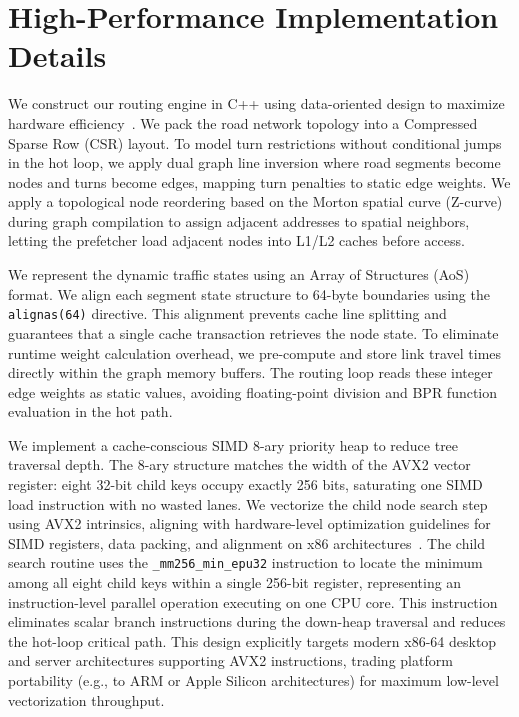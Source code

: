 \section{High-Performance Implementation Details}
\label{sec:implementation}

We construct our routing engine in C++ using data-oriented design to maximize hardware efficiency~\cite{drepper2007memory}. We pack the road network topology into a Compressed Sparse Row (CSR) layout. To model turn restrictions without conditional jumps in the hot loop, we apply dual graph line inversion where road segments become nodes and turns become edges, mapping turn penalties to static edge weights. We apply a topological node reordering based on the Morton spatial curve (Z-curve) during graph compilation to assign adjacent addresses to spatial neighbors, letting the prefetcher load adjacent nodes into L1/L2 caches before access. 

We represent the dynamic traffic states using an Array of Structures (AoS) format. 
We align each segment state structure to 64-byte boundaries using the \verb|alignas(64)| directive. 
This alignment prevents cache line splitting and guarantees that a single cache transaction retrieves the node state. 
To eliminate runtime weight calculation overhead, we pre-compute and store link travel times directly within the graph memory buffers. The routing loop reads these integer edge weights as static values, avoiding floating-point division and BPR function evaluation in the hot path.

We implement a cache-conscious SIMD 8-ary priority heap to reduce tree traversal depth. 
The 8-ary structure matches the width of the AVX2 vector register: eight 32-bit child keys occupy exactly 256 bits, saturating one SIMD load instruction with no wasted lanes. 
We vectorize the child node search step using AVX2 intrinsics, aligning with hardware-level optimization guidelines for SIMD registers, data packing, and alignment on x86 architectures~\cite{kusswurm2014modern}. 
The child search routine uses the \verb|_mm256_min_epu32| instruction to locate the minimum among all eight child keys within a single 256-bit register, representing an instruction-level parallel operation executing on one CPU core. 
This instruction eliminates scalar branch instructions during the down-heap traversal and reduces the hot-loop critical path. This design explicitly targets modern x86-64 desktop and server architectures supporting AVX2 instructions, trading platform portability (e.g., to ARM or Apple Silicon architectures) for maximum low-level vectorization throughput.
 

